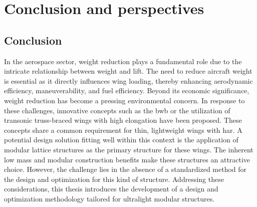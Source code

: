 \setchapterpreamble[u]{\margintoc}
\glsresetall %

\chapter*{Conclusion and perspectives}
{}
%

\section*{Conclusion}
In the aerospace sector, weight reduction plays a fundamental role due to the intricate relationship between weight and lift. The need to reduce aircraft weight is essential as it directly influences wing loading, thereby enhancing aerodynamic efficiency, maneuverability, and fuel efficiency. Beyond its economic significance, weight reduction has become a pressing environmental concern. In response to these challenges, innovative concepts such as the \gls{bwb} or the utilization of transonic truss-braced wings with high elongation have been proposed. These concepts share a common requirement for thin, lightweight wings with \gls{har}. A potential design solution fitting well within this context is the application of modular lattice structures as the primary structure for these wings. The inherent low mass and modular construction benefits make these structures an attractive choice. However, the challenge lies in the absence of a standardized method for the design and optimization for this kind of structure. Addressing these considerations, this thesis introduces the development of a design and optimization methodology tailored for ultralight modular structures.

